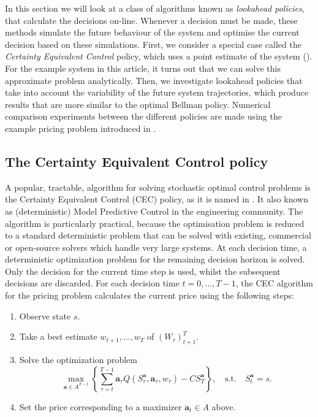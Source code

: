 \documentclass[main.tex]{subfiles}
\begin{document}
In this section we will look at a class of algorithms known as
\emph{lookahead policies}, that calculate the decisions on-line.
Whenever a decision must be made, these methods simulate the future
behaviour of the system and optimise the current decision based on
these simulations. First, we consider a special case called the
\emph{Certainty Equivalent Control} policy, which uses a point
estimate of the system (\citet[Ch.~6]{bertsekas2005dynamic}). For the
example system in this article, it turns out that we can solve
this approximate problem analytically.
Then, we investigate lookahead policies that take into account the
variability of the future system trajectories, which produce
results that are more similar to the optimal Bellman policy.
Numerical comparison experiments between the different policies are
made using the example pricing problem introduced in
.

\subsection{The Certainty Equivalent Control policy}
A popular, tractable, algorithm for solving stochastic optimal control
problems is the Certainty Equivalent Control (CEC) policy, as it is
named in \citet{bertsekas2005dynamic}.
It also known as (deterministic) Model
Predictive Control in the engineering community.
The algorithm is particularly practical, because the optimisation
problem is reduced to a standard deterministic problem that can
be solved with existing, commercial or open-source solvers which
handle very large systems.
At each decision time, a deterministic optimization problem for the
remaining decision horizon is solved. Only the decision for the
current time step is
used, whilst the subsequent decisions are discarded.
For each decision time $t=0,\dots,T-1$, the CEC algorithm for the pricing
problem calculates the current price using the following steps:
\begin{enumerate}
\item Observe state $s$.
\item Take a best estimate $w_{t+1},\dots,w_T$ of ${(W_\tau)}_{t+1}^T$.
\item Solve the optimization problem
  \begin{equation}
    \max_{\mathbf a\in A^{T-t}}\left\{\sum_{\tau=t}^{T-1}\mathbf
      a_\tau Q(S_\tau^{\mathbf a},\mathbf
      a_\tau,w_{\tau})-CS_T^{\mathbf a}\right\},
    \quad \text{s.t.}\quad S_t^{\mathbf a}=s.
  \end{equation}
\item Set the price corresponding to a maximizer
  $\mathbf a_t\in A$ above.
\end{enumerate}
\end{document}
